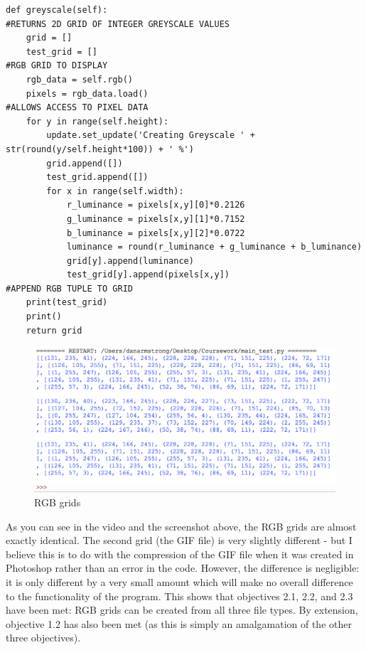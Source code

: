 \documentclass[titlepage]{article}
\begin{document}
\begin{changemargin}{-1in}{-1in} 
\begin{verbatim}
def greyscale(self):                                                        #RETURNS 2D GRID OF INTEGER GREYSCALE VALUES                                                      
    grid = []                                                               
    test_grid = []                                                          #RGB GRID TO DISPLAY                                                            
    rgb_data = self.rgb()
    pixels = rgb_data.load()                                                #ALLOWS ACCESS TO PIXEL DATA
    for y in range(self.height):                                            
        update.set_update('Creating Greyscale ' + str(round(y/self.height*100)) + ' %')
        grid.append([])
        test_grid.append([])
        for x in range(self.width):
            r_luminance = pixels[x,y][0]*0.2126
            g_luminance = pixels[x,y][1]*0.7152
            b_luminance = pixels[x,y][2]*0.0722
            luminance = round(r_luminance + g_luminance + b_luminance)      
            grid[y].append(luminance)                                       
            test_grid[y].append(pixels[x,y])                                #APPEND RGB TUPLE TO GRID
    print(test_grid)
    print()
    return grid
\end{verbatim}
\end{changemargin} 

\begin{figure}[H]
  \centering
  \includegraphics[width=12cm]{121.png}
  \caption{RGB grids}
  \label{fig:dijk}
\end{figure}

As you can see in the video and the screenshot above, the RGB grids are almost exactly identical. The second grid (the GIF file) is very slightly different - but I believe this is to do with the compression of the GIF file when it was created in Photoshop rather than an error in the code. However, the difference is negligible: it is only different by a very small amount which will make no overall difference to the functionality of the program. This shows that objectives 2.1, 2.2, and 2.3 have been met: RGB grids can be created from all three file types. By extension, objective 1.2 has also been met (as this is simply an amalgamation of the other three objectives). 
\end{document}
